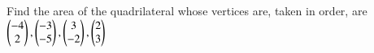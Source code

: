 Find the area of the quadrilateral whose vertices are, taken in order, are $\myvec{-4\\2}, \myvec{-3\\-5}, \myvec{3\\-2}, \myvec{2\\3}$